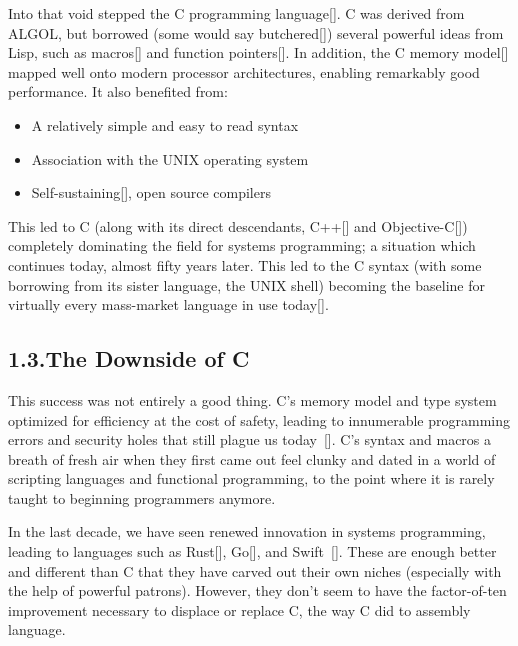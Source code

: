 \documentclass[preprint]{{sigplanconf}}
\begin{document}
\noindent Into that void stepped the C programming language{}[]. C was derived from ALGOL,
but borrowed (some would say butchered{}[]) several powerful ideas
from Lisp, such as macros{}[] and function pointers{}[]. In
addition, the C memory model{}[] mapped well onto modern processor
architectures, enabling remarkably good performance. It also benefited from:%

\begin{itemize}[noitemsep,topsep=\mdcompacttopsep]%

\item A relatively simple and easy to read syntax%

\item Association with the UNIX operating system%

\item Self-sustaining{}[], open source compilers%
\end{itemize}%

\noindent This led to C (along with its direct descendants, C++{}[] and
Objective-C{}[]) completely dominating the field for systems
programming; a situation which continues today, almost fifty years
later. This led to the C syntax (with some borrowing from its sister language, the UNIX shell) 
becoming the baseline for virtually every mass-market language in use today{}[].%

\subsection{1.3.\hspace*{0.5em}The Downside of C}\label{sec-the-downside-of-c}%

\noindent This success was not entirely a good thing. C's memory model and type
system optimized for efficiency at the cost of safety, leading to
innumerable programming errors and security holes that still plague us
today~{}[]. C's syntax and macros \textendash{}  a breath of fresh air
when they first came out \textendash{} feel clunky and dated in a world of scripting
languages and functional programming, to the point where it is rarely
taught to beginning programmers anymore.%

In the last decade, we have seen renewed innovation in systems
programming, leading to languages such as Rust{}[], Go{}[], and
Swift~{}[]. These are enough better and different than C that they
have carved out their own niches (especially with the help of powerful
patrons). However, they don't seem to have the factor-of-ten improvement
necessary to displace or replace C, the way C did to assembly language.%
\end{document}
